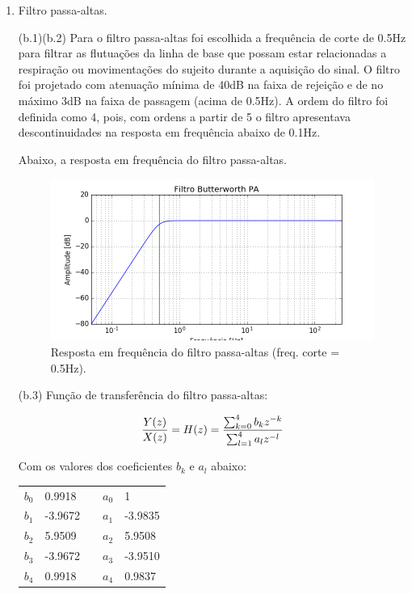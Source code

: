 \documentclass[12pt,letterpaper]{article}
\begin{document}
\begin{enumerate}[label=(\alph*)]
     \item  Filtro passa-altas.
     
    (b.1)(b.2) Para o filtro passa-altas foi escolhida a frequência de corte de 0.5Hz para filtrar as flutuações da linha de base que possam estar relacionadas a respiração ou movimentações do sujeito durante a aquisição do sinal. O filtro foi projetado com atenuação mínima de 40dB na faixa de rejeição e de no máximo 3dB na faixa de passagem (acima de 0.5Hz). A ordem do filtro foi definida como 4, pois, com ordens a partir de 5 o filtro apresentava descontinuidades na resposta em frequência abaixo de 0.1Hz.
    
    Abaixo, a resposta em frequência do filtro passa-altas.
     
        \begin{figure}[H]
            \centering
            \includegraphics[width=15cm]{TC1/images/Q2_b_filtro_PA_respfreq.png}
            \caption{Resposta em frequência do filtro passa-altas (freq. corte = 0.5Hz).}
            \label{fig:9}
        \end{figure}
        
        
    (b.3) Função de transferência do filtro passa-altas:
    
    $${Y(z) \over X(z)} = H(z) =
        {
        { \sum_{k=0}^{4}{b_k z^{-k}} }
        \over
        { \sum_{l=1}^{4}{a_l z^{-l}} }
        }
    $$
    
    Com os valores dos coeficientes $b_k$ e $a_l$ abaixo:
    
    \begin{table}[H]
    \centering
    \begin{tabular}{lllll}
        $b_{0}$ &  0.9918 & \space & $a_{0}$ &  1 \\ 
        $b_{1}$ & -3.9672 & \space & $a_{1}$ & -3.9835 \\ 
        $b_{2}$ &  5.9509 & \space & $a_{2}$ &  5.9508 \\ 
        $b_{3}$ & -3.9672 & \space & $a_{3}$ & -3.9510 \\ 
        $b_{4}$ &  0.9918 & \space & $a_{4}$ &  0.9837 \\ 


\end{tabular}
\end{table}
\end{enumerate}
\end{document}
